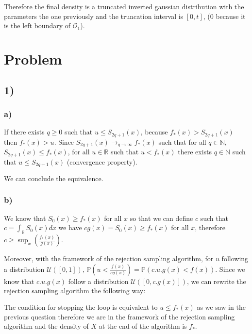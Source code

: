 Therefore the final density is a truncated inverted gaussian distribution with the parameters the one previously and the truncation interval is $[0, t]$, ($0$ because it is the left boundary of $\mathcal{O}_1$).

\section*{Problem}
\subsection*{1)}
\subsubsection*{a)}

If there exists $q \geq 0$ such that $u \leq S_{2q+1}(x)$, because $f_*(x) > S_{2q+1}(x)$ then $f_*(x) > u$.
Since $S_{2q+1}(x) \rightarrow_{q \rightarrow \infty} f_*(x)$ such that for all $q \in \mathbb{N}$, $S_{2q+1}(x) \leq f_*(x)$, for all $u \in \mathbb{R}$ such that $u < f_{*}(x)$ there exists $q \in \mathbb{N}$ such that $u \leq S_{2q+1}(x)$ (convergence property). 

We can conclude the equivalence.

\subsubsection{b)}

We know that $S_0(x) \geq f_*(x)$ for all $x$ so that we can define $c$ such that $c = \int_{\mathbb{R}} S_0(x)dx$ we have $cg(x) = S_0(x) \geq f_*(x)$ for all $x$, therefore $c \geq \sup_x\left( \frac{f_*(x)}{g(x)} \right)$.

Moreover, with the framework of the rejection sampling algorithm, for $u$ following a distribution $\mathcal{U}([0,1])$, $\mathbb{P}(u < \frac{f(x)}{cg(x)}) = \mathbb{P}(c .u. g(x) < f(x))$. Since we know that $c.u.g(x)$ follow a distribution $\mathcal{U}([0,c.g(x)])$, we can rewrite the rejection sampling algorithm the following way:

\begin{algorithm}[H]
\end{algorithm}


The condition for stopping the loop is equivalent to $u \leq f_*(x)$ as we saw in the previous question therefore we are in the framework of the rejection sampling algorithm and the density of $X$ at the end of the algorithm is $f_*$.

